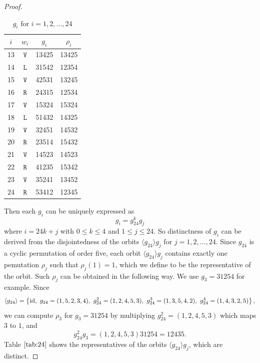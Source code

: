 \documentclass[lualatex,11pt]{article}
\begin{document}
\begin{proof}
\begin{center}
\begin{table}[H]
\begin{center}
\begin{tabular}{c|c|c|c}
$i$ & $w_i$ & $g_i$ &  $\rho_i$ \\
 \hline
13 &   $\mathtt{V}$ &  13425 & 13425 \\
14 &   $\mathtt{L}$ &  31542 & 12354 \\
15 &   $\mathtt{V}$ &  42531 & 13245 \\
16 &   $\mathtt{R}$ &  24315 & 12534 \\
17 &   $\mathtt{V}$ &  15324 & 15324 \\
18 &   $\mathtt{L}$ &  51432 & 14325 \\
19 &   $\mathtt{V}$ &  32451 & 14532 \\
20 &   $\mathtt{R}$ &  23514 & 15432 \\
21 &   $\mathtt{V}$ &  14523 & 14523 \\
22 &   $\mathtt{R}$ &  41235 & 15342 \\
23 &   $\mathtt{V}$ &  35241 & 13452 \\
24 &   $\mathtt{R}$ &  53412 & 12345 \\
\end{tabular}
  \end{center}
  \caption{$g_{i} \mbox{ for } i=1,2,\ldots,24$}
  \label{tab:24}
 \end{table}
\end{center}
Then each $g_i$ can be uniquely expressed as
\[
 g_i=g_{24}^k g_j
\]
where $i=24k+j$ with $0\leq k\leq 4$ and $1\leq j\leq 24$.
So distinctness of $g_i$ can be derived from the disjointedness
of the orbits $\langle g_{24}\rangle g_j$ for $j=1,2,\ldots, 24$.
 Since $g_{24}$ is a cyclic permutation of
order five, each orbit $\langle g_{24}\rangle g_j$ contains
exactly one pemutation $\rho_j$ such that $\rho_j(1)=1$,
which we define to be the representative of the orbit.
Such $\rho_j$ can be obtained in the following way. 
We use $g_3=31254$ for example. Since
\[
 \langle g_{24}\rangle = \left\{{\rm id},~ g_{24}=(1,5,2,3,4),~ 
 g_{24}^2=(1,2,4,5,3),~ g_{24}^3=(1,3,5,4,2),~ g_{24}^4=(1,4,3,2,5)\right\},
\]
we can compute $\rho_3$ for  $g_3=31254$ by multiplying
$g_{24}^2=(1,2,4,5,3)$ which maps $3$ to $1$, and
\[
 g_{24}^2g_3=(1,2,4,5,3)31254 = 12435.
\]
Table $\ref{tab:24}$ shows the representatives of 
the orbits $\langle g_{24}\rangle g_j$, which are distinct.
\end{proof}
\end{document}
